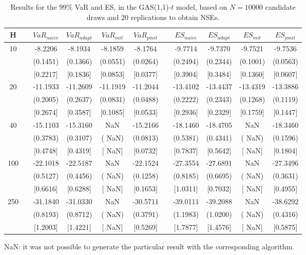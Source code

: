 \begin{table}[h] 
\centering 
\caption{Results for the $99\%$ VaR and ES, in the GAS(1,1)-$t$ model, based on $N=10000$ candidate draws and $20$ replications to obtain NSEs.} 
\label{tab:res_algos_t_gas} 
\begin{tabular}{ccccccccccc}  
 H & & $VaR_{naive}$ & $VaR_{adapt}$ & $VaR_{mit}$  & $VaR_{pmit}$ &  & $ES_{naive}$ & $ES_{adapt}$ & $ES_{mit}$ & $ES_{pmit}$ \\ \hline 
10 & & -8.2206 & -8.1934 & -8.1859 & -8.1764 & & -9.7714 & -9.7370 & -9.7521 & -9.7536  \\ 
 & & (0.1451) & (0.1366) & (0.0551) & (0.0264) & & (0.2494) & (0.2344) & (0.1001) & (0.0563)   \\ 
 & & $[$0.2217$]$ & $[$0.1836$]$ & $[$0.0853$]$ & $[$0.0377$]$ & & $[$0.3904$]$ & $[$0.3484$]$ & $[$0.1360$]$ & $[$0.0607$]$  \\ [1ex] 
20 & & -11.1933 & -11.2609 & -11.1919 & -11.2044 & & -13.4102 & -13.4437 & -13.4319 & -13.3886  \\ 
 & & (0.2005) & (0.2637) & (0.0831) & (0.0488) & & (0.2222) & (0.2343) & (0.1268) & (0.1119)   \\ 
 & & $[$0.2674$]$ & $[$0.3587$]$ & $[$0.1085$]$ & $[$0.0533$]$ & & $[$0.2936$]$ & $[$0.2329$]$ & $[$0.1759$]$ & $[$0.1447$]$  \\ [1ex] 
40 & & -15.1103 & -15.3160 &    NaN & -15.2166 & & -18.1460 & -18.4705 &    NaN & -18.3460  \\ 
 & & (0.3783) & (0.3107) & (   NaN) & (0.0813) & & (0.5381) & (0.4341) & (   NaN) & (0.1596)   \\ 
 & & $[$0.4748$]$ & $[$0.4319$]$ & $[$   NaN$]$ & $[$0.0732$]$ & & $[$0.7837$]$ & $[$0.5642$]$ & $[$   NaN$]$ & $[$0.1804$]$  \\ [1ex] 
100 & & -22.1018 & -22.5187 &    NaN & -22.1524 & & -27.3554 & -27.6891 &    NaN & -27.3496  \\ 
 & & (0.5127) & (0.4456) & (   NaN) & (0.1258) & & (0.8185) & (0.6695) & (   NaN) & (0.3631)   \\ 
 & & $[$0.6616$]$ & $[$0.6288$]$ & $[$   NaN$]$ & $[$0.1653$]$ & & $[$1.0311$]$ & $[$0.7032$]$ & $[$   NaN$]$ & $[$0.4955$]$  \\ [1ex] 
250 & & -31.1840 & -31.0330 &    NaN & -30.5711 & & -39.0111 & -39.2088 &    NaN & -38.6292  \\ 
 & & (0.8193) & (0.8712) & (   NaN) & (0.3791) & & (1.1983) & (1.0200) & (   NaN) & (0.4316)   \\ 
 & & $[$1.2003$]$ & $[$1.4221$]$ & $[$   NaN$]$ & $[$0.5269$]$ & & $[$1.7877$]$ & $[$1.4576$]$ & $[$   NaN$]$ & $[$0.5875$]$  \\ [1ex] 
\hline 
\end{tabular} 
\raggedright 

\vspace{5pt}\footnotesize{NaN: it was not possible to generate the particular result with the corresponding algorithm.} 
\end{table} 
